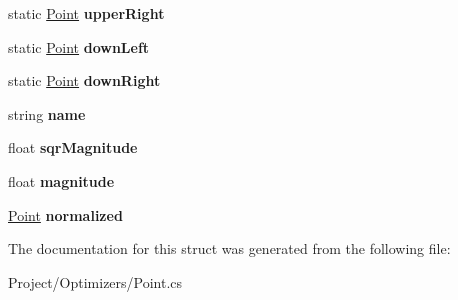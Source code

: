 \begin{DoxyCompactItemize}
\item 
\mbox{\label{struct_lerp2_a_p_i_1_1_optimizers_1_1_point_ab847e2518a7c869d40499e8838ceb185}} 
static \hyperlink{struct_lerp2_a_p_i_1_1_optimizers_1_1_point}{Point} {\bfseries upper\+Right}
\item 
\mbox{\label{struct_lerp2_a_p_i_1_1_optimizers_1_1_point_a8f5f343148df2c672fc252f90c83bf2c}} 
static \hyperlink{struct_lerp2_a_p_i_1_1_optimizers_1_1_point}{Point} {\bfseries down\+Left}
\item 
\mbox{\label{struct_lerp2_a_p_i_1_1_optimizers_1_1_point_a03bcb81890e6f6f2a29675d4fbd90f03}} 
static \hyperlink{struct_lerp2_a_p_i_1_1_optimizers_1_1_point}{Point} {\bfseries down\+Right}
\item 
\mbox{\label{struct_lerp2_a_p_i_1_1_optimizers_1_1_point_a23b769b48a63412cc480c1963908e611}} 
string {\bfseries name}
\item 
\mbox{\label{struct_lerp2_a_p_i_1_1_optimizers_1_1_point_a134fb789dcfd41fa04c58e7177e3e7da}} 
float {\bfseries sqr\+Magnitude}
\item 
\mbox{\label{struct_lerp2_a_p_i_1_1_optimizers_1_1_point_a3ec2985e89e5bbc696238e38edccddff}} 
float {\bfseries magnitude}
\item 
\mbox{\label{struct_lerp2_a_p_i_1_1_optimizers_1_1_point_a983cf4bffb81f75288c690d0a1245810}} 
\hyperlink{struct_lerp2_a_p_i_1_1_optimizers_1_1_point}{Point} {\bfseries normalized}
\end{DoxyCompactItemize}


The documentation for this struct was generated from the following file\+:\begin{DoxyCompactItemize}
\item 
Project/\+Optimizers/Point.\+cs\end{DoxyCompactItemize}
